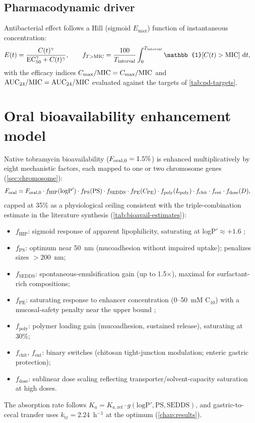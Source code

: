 \subsection{Pharmacodynamic driver}
Antibacterial effect follows a Hill (sigmoid $E_{\max}$) function of instantaneous concentration:
\begin{equation}
E(t) = \frac{C(t)^{\gamma}}{\mathrm{EC}_{50}^{\gamma} + C(t)^{\gamma}}, \qquad
\fmic = \frac{100}{T_{\mathrm{interval}}} \int_0^{T_{\mathrm{interval}}} \mathbb{1}\!\left[C(t) > \mathrm{MIC}\right]\,\mathrm{d}t,
\label{eq:hill}
\end{equation}
with the efficacy indices $C_{\max}/\mathrm{MIC} = C_{\max}/\mathrm{MIC}$ and $\mathrm{AUC}_{24}/\mathrm{MIC} = \mathrm{AUC}_{24}/\mathrm{MIC}$ evaluated against the targets of \cref{tab:pd-targets}.

\section{Oral bioavailability enhancement model}
\label{sec:F-model}
Native tobramycin bioavailability ($F_{\mathrm{oral},0} = 1.5\%$) is enhanced multiplicatively by eight mechanistic factors, each mapped to one or two chromosome genes (\cref{sec:chromosome}):
\begin{equation}
F_{\mathrm{oral}} = F_{\mathrm{oral},0} \cdot f_{\mathrm{HIP}}(\mathrm{logP}') \cdot f_{\mathrm{PS}}(\mathrm{PS}) \cdot f_{\mathrm{SEDDS}} \cdot f_{\mathrm{PE}}(C_{\mathrm{PE}}) \cdot f_{\mathrm{poly}}(L_{\mathrm{poly}}) \cdot f_{\mathrm{chit}} \cdot f_{\mathrm{ent}} \cdot f_{\mathrm{dose}}(D),
\label{eq:F-factors}
\end{equation}
capped at 35\% as a physiological ceiling consistent with the triple-combination estimate in the literature synthesis (\cref{tab:bioavail-estimates}):
\begin{itemize}
\item $f_{\mathrm{HIP}}$: sigmoid response of apparent lipophilicity, saturating at logP$'\approx+1.6$ \citep{Asad2023};
\item $f_{\mathrm{PS}}$: optimum near 50~nm (mucoadhesion without impaired uptake); penalizes sizes $>$200~nm;
\item $f_{\mathrm{SEDDS}}$: spontaneous-emulsification gain (up to 1.5$\times$), maximal for surfactant-rich compositions;
\item $f_{\mathrm{PE}}$: saturating response to enhancer concentration (0--50~mM C$_{10}$) with a mucosal-safety penalty near the upper bound \citep{Maher2009, Bohley2024};
\item $f_{\mathrm{poly}}$: polymer loading gain (mucoadhesion, sustained release), saturating at 30\%;
\item $f_{\mathrm{chit}}$, $f_{\mathrm{ent}}$: binary switches (chitosan tight-junction modulation; enteric gastric protection);
\item $f_{\mathrm{dose}}$: sublinear dose scaling reflecting transporter/solvent-capacity saturation at high doses.
\end{itemize}
The absorption rate follows $K_a = K_{a,\mathrm{ref}} \cdot g(\mathrm{logP}', \mathrm{PS}, \mathrm{SEDDS})$, and gastric-to-cecal transfer uses $k_{\mathrm{tr}} = 2.24$~h$^{-1}$ at the optimum (\cref{chap:results}).

